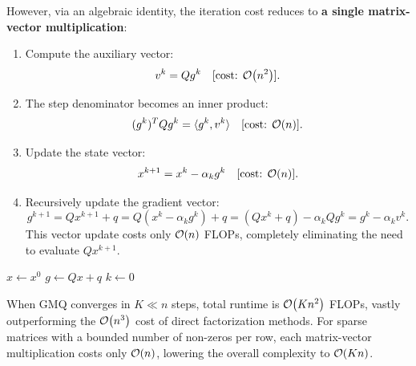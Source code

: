 However, via an algebraic identity, the iteration cost reduces to \textbf{a single matrix-vector multiplication}:
\begin{enumerate}
    \item Compute the auxiliary vector:
    \begin{equation}
        v^k = Q g^k \quad [\text{cost: } \mathcal{O}\!\left(n^2\right)].
    \end{equation}
    \item The step denominator becomes an inner product:
    \begin{equation}
        (g^k)^T Q g^k = \langle g^k, v^k \rangle \quad [\text{cost: } \mathcal{O}\!\left(n\right)].
    \end{equation}
    \item Update the state vector:
    \begin{equation}
        x^{k+1} = x^k - \alpha_k g^k \quad [\text{cost: } \mathcal{O}\!\left(n\right)].
    \end{equation}
    \item Recursively update the gradient vector:
    \begin{equation}
        g^{k+1} = Q x^{k+1} + q = Q(x^k - \alpha_k g^k) + q = (Q x^k + q) - \alpha_k Q g^k = g^k - \alpha_k v^k.
    \end{equation}
    This vector update costs only $\mathcal{O}\!\left(n\right)$ FLOPs, completely eliminating the need to evaluate $Q x^{k+1}$.
\end{enumerate}

\begin{algorithm}[H]
\caption{Gradient Method for Quadratic Functions (Optimized GMQ)}
\label{alg:optimized-gmq-en}
$x \gets x^0$\;
$g \gets Q x + q$\;
$k \gets 0$\;
\end{algorithm}

When GMQ converges in $K \ll n$ steps, total runtime is $\mathcal{O}\!\left(K n^2\right)$ FLOPs, vastly outperforming the $\mathcal{O}\!\left(n^3\right)$ cost of direct factorization methods. For sparse matrices with a bounded number of non-zeros per row, each matrix-vector multiplication costs only $\mathcal{O}\!\left(n\right)$, lowering the overall complexity to $\mathcal{O}\!\left(K n\right)$.


